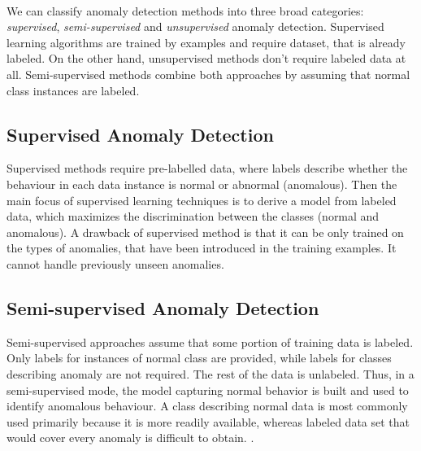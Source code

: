 

\\
We can classify anomaly detection methods into three broad categories: \textit{supervised}, \textit{semi-supervised} and \textit{unsupervised} anomaly detection. Supervised learning algorithms are trained by examples and require dataset, that is already labeled. On the other hand, unsupervised methods don't require labeled data at all. Semi-supervised methods combine both approaches by assuming that normal class instances are labeled.


\subsection{Supervised Anomaly Detection}
Supervised methods require pre-labelled data, where labels describe whether the behaviour in each data instance is normal or abnormal (anomalous). Then the main focus of supervised learning techniques is to derive a model from labeled data, which maximizes the discrimination between the classes (normal and anomalous). A drawback of supervised method is that it can be only trained on the types of anomalies, that have been introduced in the training examples. It cannot handle previously unseen anomalies. 

 \subsection{Semi-supervised Anomaly Detection}
 Semi-supervised approaches assume that some portion of training data is labeled. Only labels for instances of normal class are provided, while labels for classes describing anomaly are not required. The rest of the data is unlabeled. Thus, in a semi-supervised mode, the model capturing normal behavior is built and used to identify anomalous behaviour. A class describing normal data is most commonly used primarily because it is more readily available, whereas labeled data set that would cover every anomaly is difficult to obtain.  \cite{anomalyDetectionSurvey}. 
 
